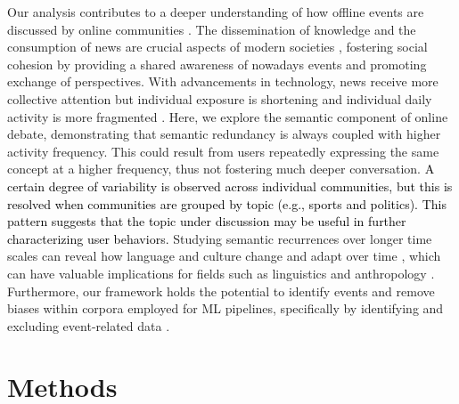\documentclass[fleqn,10pt]{wlscirep}
\newcommand{\new}[1]{\textcolor{black}{#1}}
\begin{document}
Our analysis contributes to a deeper understanding of how offline events are discussed by online communities \cite{candia2019universal}.
The dissemination of knowledge and the consumption of news \cite{del2016spreading,gravino2022supply} are crucial aspects of modern societies \cite{watts2021measuring}, fostering social cohesion by providing a shared awareness of nowadays events and promoting exchange of perspectives.
With advancements in technology, news receive more collective attention but individual exposure is shortening \cite{lorenz2019accelerating} and individual daily activity is more fragmented \cite{sullivan2018speed}.
Here, we explore the semantic component of online debate, demonstrating that semantic redundancy is always coupled with higher activity frequency. 
This could result from users repeatedly expressing the same concept at a higher frequency, thus not fostering much deeper conversation.
\new{
A certain degree of variability is observed across individual communities, but this is resolved when communities are grouped by topic (e.g., sports and politics).
This pattern suggests that the topic under discussion may be useful in further characterizing user behaviors.
}
Studying semantic recurrences over longer time scales can reveal how language and culture change and adapt over time \cite{fortier2017hypermodern}, which can have valuable implications for fields such as linguistics \cite{graddol2004future} and anthropology \cite{malley2008some}. 
Furthermore, our framework holds the potential to identify events and remove biases within corpora employed for ML pipelines, specifically by identifying and excluding event-related data \cite{meade_empirical_2022}.

%
\section*{Methods}
\end{document}

